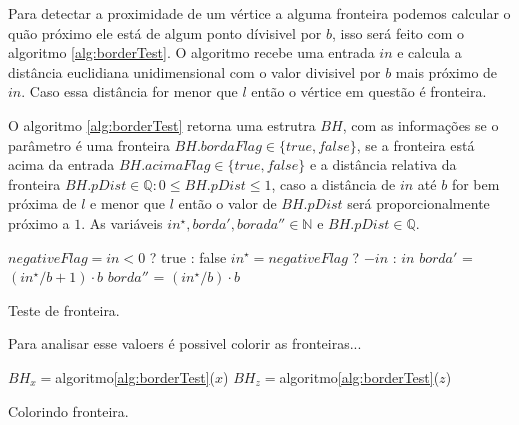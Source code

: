 Para detectar a proximidade de um vértice a alguma fronteira podemos calcular o 
quão próximo ele está de algum ponto dívisivel por $b$, isso será feito com 
o algoritmo \ref{alg:borderTest}. O algoritmo recebe uma entrada $in$ e calcula
a distância euclidiana unidimensional com o valor divisivel por $b$ mais próximo 
de $in$. Caso essa distância for menor que $l$ então o vértice em questão é 
fronteira.

O algoritmo \ref{alg:borderTest} retorna uma estrutra $BH$, com as informações
se o parâmetro é uma fronteira $BH.bordaFlag \in \{true, false\}$, se a fronteira 
está acima da entrada $BH.acimaFlag \in \{true, false\}$ e a distância relativa 
da fronteira $BH.pDist \in \mathbb{Q}: 0 \leq BH.pDist \leq 1$, caso a distância de $in$ até $b$ for bem 
próxima de $l$ e menor que $l$ então o valor de $BH.pDist$ será proporcionalmente
próximo a $1$. As variáveis
$in^{\star}, borda', borada'' \in \mathbb{N}$ e $BH.pDist \in \mathbb{Q}$.

\begin{algorithm}[H]\label{alg:borderTest}%
    $negativeFlag = in < 0$ ? true : false\;
    $in^{\star} = negativeFlag$ ? $-in$ : $in$\;
    $borda'$ = $(in^{\star}/b +1) \cdot b$\;
    $borda''$ = $(in^{\star}/b) \cdot b$\;
    
    
    
    \caption{Teste de fronteira.}
\end{algorithm}

Para analisar esse valoers é possivel colorir as fronteiras...

\begin{algorithm}[H]\label{alg:borderColor}%
    $BH_{x} = $algoritmo\ref{alg:borderTest}($x$)\;
    $BH_{z} = $algoritmo\ref{alg:borderTest}($z$)\;
    
    
    \caption{Colorindo fronteira.}
\end{algorithm}

